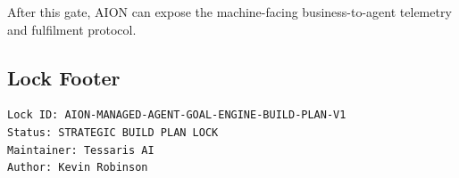 After this gate, AION can expose the machine-facing business-to-agent telemetry and fulfilment protocol.

\subsection{Lock Footer}

\begin{verbatim}
Lock ID: AION-MANAGED-AGENT-GOAL-ENGINE-BUILD-PLAN-V1
Status: STRATEGIC BUILD PLAN LOCK
Maintainer: Tessaris AI
Author: Kevin Robinson
\end{verbatim}

